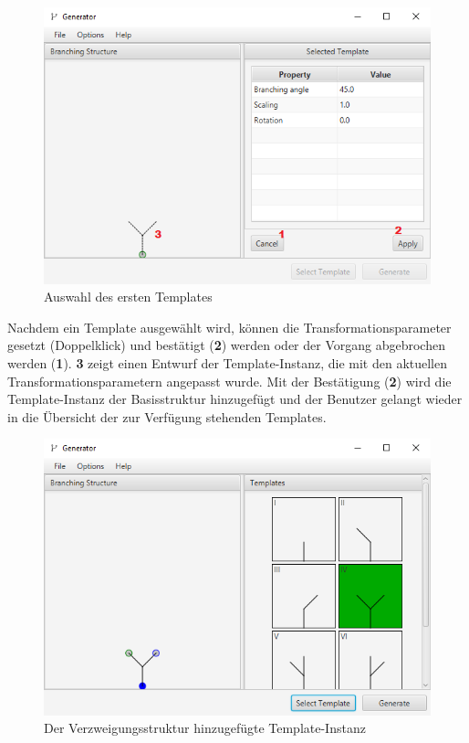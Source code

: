 \begin{figure}[H]
    \centering
    \includegraphics[width=12cm]{../images/UI_template.png}
    \caption{Auswahl des ersten Templates}
\end{figure}

Nachdem ein Template ausgewählt wird, können die Transformationsparameter gesetzt (Doppelklick) und bestätigt (\textbf{2})
werden oder der Vorgang abgebrochen werden (\textbf{1}).
\textbf{3} zeigt einen Entwurf der Template-Instanz, die mit den aktuellen Transformationsparametern angepasst wurde.
Mit der Bestätigung (\textbf{2}) wird die Template-Instanz der Basisstruktur hinzugefügt und der Benutzer gelangt wieder
in die Übersicht der zur Verfügung stehenden Templates.
\begin{figure}[H]
    \centering
    \includegraphics[width=12cm]{../images/UI_applied.png}
    \caption{Der Verzweigungsstruktur hinzugefügte Template-Instanz}
\end{figure}

